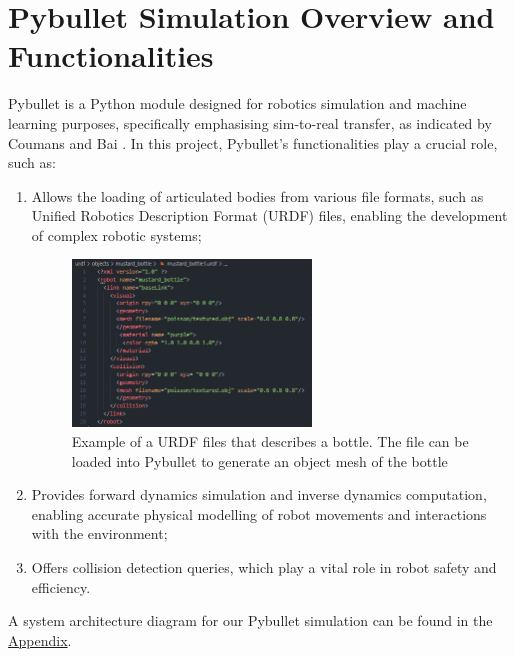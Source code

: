 \documentclass[11pt, a4paper]{report}
\begin{document}
\section{Pybullet Simulation Overview and Functionalities}\label{sec:3.1}
Pybullet is a Python module designed for robotics simulation and machine learning purposes, specifically emphasising sim-to-real transfer, as indicated by Coumans and Bai \cite{coumans2021}. In this project, Pybullet's functionalities play a crucial role, such as:
\begin{enumerate}[\itemsep=0em]
    \item Allows the loading of articulated bodies from various file formats, such as Unified Robotics Description Format (URDF) files, enabling the development of complex robotic systems;
    \begin{figure}[H]
        \centering
        \includegraphics[width=0.6\textwidth]{docs/Project Report/Media/3_1_urdf_eg.png}
        \caption{Example of a URDF files that describes a bottle. The file can be loaded into Pybullet to generate an object mesh of the bottle}
        \label{fig:3.1}
    \end{figure}
    \vspace{-0.2cm}
    \item Provides forward dynamics simulation and inverse dynamics computation, enabling accurate physical modelling of robot movements and interactions with the environment;
    \item Offers collision detection queries, which play a vital role in robot safety and efficiency.
\end{enumerate}
A system architecture diagram for our Pybullet simulation can be found in the \hyperref[apdx:1]{Appendix}.
\end{document}
